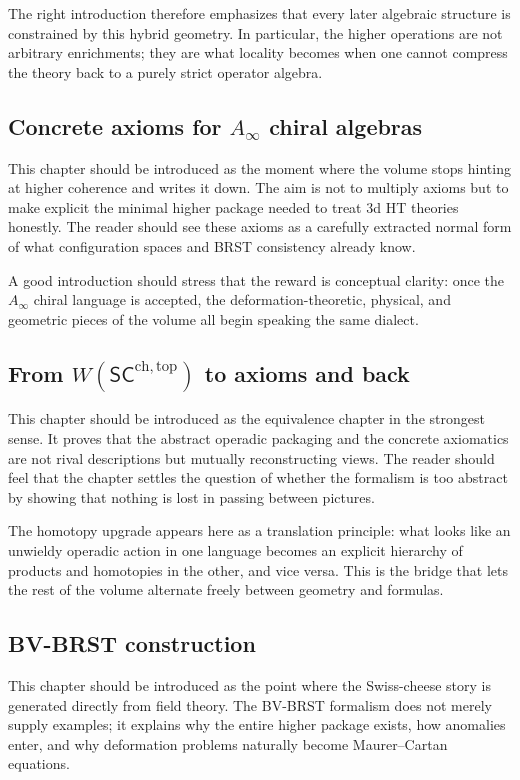 The right introduction therefore emphasizes that every later algebraic structure is constrained by this hybrid geometry.  In particular, the higher operations are not arbitrary enrichments; they are what locality becomes when one cannot compress the theory back to a purely strict operator algebra.

\subsection*{Concrete axioms for $A_\infty$ chiral algebras}
This chapter should be introduced as the moment where the volume stops hinting at higher coherence and writes it down.  The aim is not to multiply axioms but to make explicit the minimal higher package needed to treat 3d HT theories honestly.  The reader should see these axioms as a carefully extracted normal form of what configuration spaces and BRST consistency already know.

A good introduction should stress that the reward is conceptual clarity: once the $A_\infty$ chiral language is accepted, the deformation-theoretic, physical, and geometric pieces of the volume all begin speaking the same dialect.

\subsection*{From $W(\mathsf{SC}^{\mathrm{ch,top}})$ to axioms and back}
This chapter should be introduced as the equivalence chapter in the strongest sense.  It proves that the abstract operadic packaging and the concrete axiomatics are not rival descriptions but mutually reconstructing views.  The reader should feel that the chapter settles the question of whether the formalism is too abstract by showing that nothing is lost in passing between pictures.

The homotopy upgrade appears here as a translation principle: what looks like an unwieldy operadic action in one language becomes an explicit hierarchy of products and homotopies in the other, and vice versa.  This is the bridge that lets the rest of the volume alternate freely between geometry and formulas.

\subsection*{BV-BRST construction}
This chapter should be introduced as the point where the Swiss-cheese story is generated directly from field theory.  The BV-BRST formalism does not merely supply examples; it explains why the entire higher package exists, how anomalies enter, and why deformation problems naturally become Maurer--Cartan equations.

